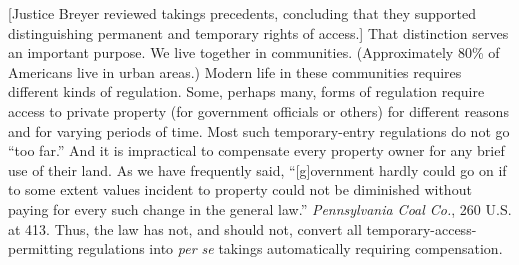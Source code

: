 %
%
%
%
%
[Justice Breyer reviewed takings precedents, concluding that they supported
distinguishing permanent and temporary rights of access.]
That distinction serves an important purpose. We live together
in communities. (Approximately 80\% of Americans live in urban areas.) Modern
life in these communities requires different kinds of regulation. Some, perhaps
many, forms of regulation require access to private property (for government
officials or others) for different reasons and for varying periods of time. Most
such temporary-entry regulations do not go ``too far.'' And it is impractical to
compensate every property owner for any brief use of their land. As we have
frequently said, ``[g]overnment hardly could go on if to some extent values
incident to property could not be diminished without paying for every such
change in the general law.'' \textit{Pennsylvania Coal Co.}, 260 U.S. at 413.
Thus, the law has not, and should not, convert all temporary-access-permitting
regulations into \textit{per se} takings automatically requiring compensation. 


